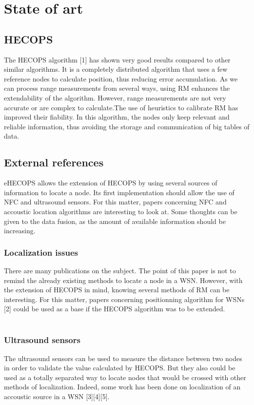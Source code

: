 \documentclass[a4paper,10pt]{article}
\begin{document}
\section{State of art}

\subsection{HECOPS} 
The HECOPS algorithm [1] has shown very good results compared to other similar algorithms. It is a completely distributed algorithm that uses a few 
reference nodes to calculate position, thus reducing error accumulation. As we can process range measurements from several ways, using RM enhances the 
extendability of the algorithm. However, range measurements are not very accurate or are complex to calculate.The use of heuristics to calibrate RM has 
improved their fiability. In this algorithm, the nodes only keep relevant and reliable information, thus avoiding the storage and communication
of big tables of data.

\subsection{External references}

eHECOPS allows the extension of HECOPS by using several sources of information to locate a node. Its first implementation should allow the use of 
NFC and ultrasound sensors. For this matter, papers concerning NFC and accoustic location algorithms are interesting to look at. 
Some thoughts can be given to the data fusion, as the amount of available information should be increasing.

\subsubsection{Localization issues}
There are many publications on the subject. The point of this paper is not to remind the already existing methods to locate a node in a WSN. 
However, with the extension of HECOPS in mind, knowing several methods of RM can be interesting. For this matter, papers concerning positionning 
algorithm for WSNs [2] could be used as a base if the HECOPS algorithm was to be extended.\\ \\

\subsubsection{Ultrasound sensors}
The ultrasound sensors can be used to measure the distance between two nodes in order to validate the value calculated by HECOPS. But they also could 
be used as a totally separated way to locate nodes that would be crossed with other methods of localization. Indeed, some work has been done on 
localization of an accoustic source in a WSN [3][4][5].
\end{document}
